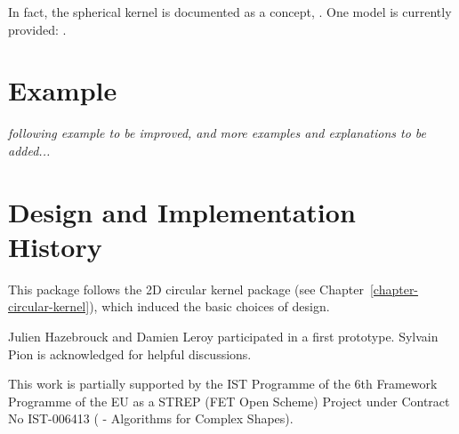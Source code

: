 In fact, the spherical kernel is documented as a concept,
. One model is currently provided: 
.

\section{Example}
\textit{following example to be improved, and more examples and explanations to be added...}


\section{Design and Implementation History}

This package follows the 2D circular kernel package (see
Chapter~\ref{chapter-circular-kernel}), which induced the basic
choices of design.

Julien Hazebrouck and Damien Leroy participated in a first
prototype. Sylvain Pion is acknowledged for helpful discussions.

This work is partially supported by the IST Programme of the 6th
Framework Programme of the EU as a STREP (FET Open Scheme) Project
under Contract No IST-006413 ( -
Algorithms for Complex Shapes).
